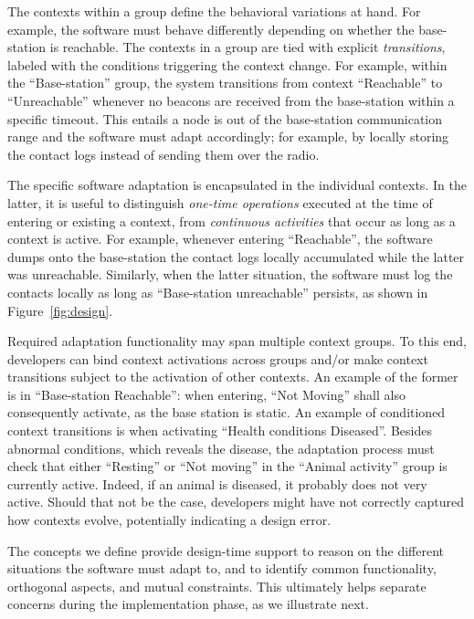 The contexts within a group define the behavioral variations at
hand. For example, the software must behave differently depending on
whether the base-station is reachable.  The contexts in a group are
tied with explicit \emph{transitions}, labeled with the conditions
triggering the context change. For example, within the
``Base-station'' group, the system transitions from context
``Reachable'' to ``Unreachable'' whenever no beacons are received from
the base-station within a specific timeout. This entails a node is out
of the base-station communication range and the software must adapt
accordingly; for example, by locally storing the contact logs instead
of sending them over the radio.

The specific software adaptation is encapsulated in the individual
contexts. In the latter, it is useful to distinguish \emph{one-time
operations} executed at the time of entering or existing a context,
from \emph{continuous activities} that occur as long as a context is
active. For example, whenever entering ``Reachable'', the software
dumps onto the base-station the contact logs locally accumulated while
the latter was unreachable. Similarly, when the latter situation, the
software must log the contacts locally as long as ``Base-station
unreachable'' persists, as shown in Figure~\ref{fig:design}.

Required adaptation functionality may span multiple context groups. To
this end, developers can bind context activations across groups and/or
make context transitions subject to the activation of other
contexts. An example of the former is in ``Base-station Reachable'': when
entering, ``Not Moving'' shall also consequently activate, as the base station
is static. An example of conditioned context transitions is when activating
``Health conditions Diseased''. Besides abnormal conditions, which reveals the
disease, the adaptation process must check that either ``Resting'' or ``Not
moving'' in the ``Animal activity'' group is currently active. Indeed, if an
animal is diseased, it probably does not very active. Should that not be the
case, developers might have not correctly captured how contexts evolve,
potentially indicating a design error.

The concepts we define provide design-time support to reason on the
different situations the software must adapt to, and to identify common
functionality, orthogonal aspects, and mutual constraints. This
ultimately helps separate concerns during the implementation phase, as
we illustrate next.



